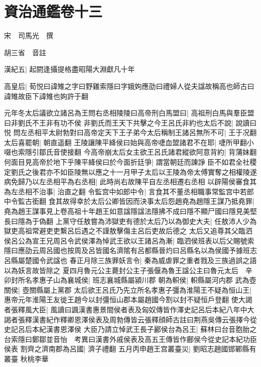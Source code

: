 \chapter{資治通鑑卷十三}
宋　司馬光　撰

胡三省　音註

漢紀五|{
	起閼逢攝提格盡昭陽大淵獻凡十年}


高皇后|{
	荀悦曰諱雉之字曰野雞索隱曰字娥姁應劭曰禮婦人從夫諡故稱高也師古曰諱雉故臣下諱雉也姁許于翻}


元年冬太后議欲立諸呂為王問右丞相陵陵曰高帝刑白馬盟曰|{
	高祖刑白馬與羣臣盟曰非劉氏不王非有功不侯}
非劉氏而王天下共擊之今王呂氏非約也太后不說|{
	說讀曰悦}
問左丞相平太尉勃對曰高帝定天下王子弟今太后稱制王諸呂無所不可|{
	王于况翻}
太后喜罷朝|{
	朝直遥翻}
王陵讓陳平絳侯曰始與高帝啑血盟諸君不在耶|{
	啑所甲翻小啜也索隱引鄒氏音使接翻}
今高帝崩太后女主欲王呂氏諸君縱欲阿意背約|{
	背蒲妹翻}
何面目見高帝於地下乎陳平絳侯曰於今面折廷爭|{
	謂當朝廷而諫諍}
臣不如君全社稷定劉氏之後君亦不如臣陵無以應之十一月甲子太后以王陵為帝太傅實奪之相權陵遂病免歸乃以左丞相平為右丞相|{
	此時尚右故陳平自左丞相遷右丞相}
以辟陽侯審食其為左丞相不治事|{
	治直之翻}
令監宫中如郎中令|{
	言食其不董丞相職事常監宫中若郎中令監古銜翻}
食其故得幸於太后公卿皆因而決事太后怨趙堯為趙隱王謀乃抵堯罪|{
	堯為趙王謀事見上卷高祖十年趙王如意諡隱諡法隱拂不成曰隱不顯尸國曰隱見美堅長曰隱為于偽翻}
上黨守任敖嘗為沛獄吏有德於太后乃以為御史大夫|{
	任敖沛人少為獄吏高祖常避吏吏繫呂后遇之不謹敖擊傷主呂后吏故后德之}
太后又追尊其父臨泗侯呂公為宣王兄周呂令武侯澤為悼武王欲以王諸呂為漸|{
	臨泗侯班表以后父賜號索隱曰應劭云周呂國也按周及呂皆國名濟隂有呂都縣晉灼曰呂縣名以為侯國予據班志呂縣屬楚國令武諡也}
春正月除三族罪妖言令|{
	秦為威虐罪之重者戮及三族過誤之語以為妖言故皆除之}
夏四月魯元公主薨封公主子張偃為魯王諡公主曰魯元太后　辛卯封所名孝惠子山為襄城侯|{
	班志襄城縣屬潁川郡}
朝為軹侯|{
	軹縣屬河内郡}
武為壺關侯|{
	壺關縣屬上黨郡}
太后欲王呂氏乃先立所名孝惠子彊為淮陽王不疑為恒山王|{
	惠帝元年淮陽王友徙王趙今以封彊恒山郡本屬趙國今割以封不疑恒戶登翻}
使大謁者張釋風大臣|{
	風讀曰諷漢書惠景間侯者表及匈奴傳皆作澤史記呂后本紀八年中大謁者張釋漢書紀作釋卿恩澤侯表及周勃傳皆云張釋顔師古註曰荆燕吳傳云張擇今從史記呂后本紀漢書恩澤侯}
大臣乃請立悼武王長子酈侯台為呂王|{
	蘇林曰台音胞胎之台索隱曰鄭鄒並音怡　考異曰漢書外戚侯表及高五王傳皆作鄜侯今從史記本紀功臣侯表}
割齊之濟南郡為呂國|{
	濟子禮翻}
五月丙申趙王宫叢臺災|{
	劉昭志趙國邯鄲縣有叢臺}
秋桃李華


